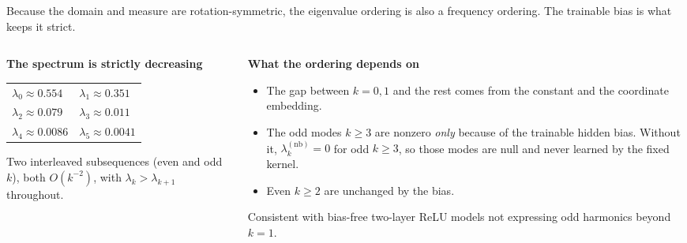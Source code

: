 \documentclass[aspectratio=169,9pt]{beamer}
\begin{document}
\begin{frame}[noframenumbering]
	{\textcolor{muted}{Because the domain and measure are rotation-symmetric, the eigenvalue ordering is also a frequency ordering. The trainable bias is what keeps it strict.}}

	\vspace{1.5mm}
	\begin{columns}[T,onlytextwidth]
		\begin{column}{0.46\textwidth}
			\begin{whitecard}[height=42mm]
				{\scriptsize\bfseries The spectrum is strictly decreasing}\par\vspace{1mm}
				{\scriptsize
					\begin{tabular}{@{}ll@{}}
						$\lambda_0\approx0.554$  & $\lambda_1\approx0.351$  \\
						$\lambda_2\approx0.079$  & $\lambda_3\approx0.011$  \\
						$\lambda_4\approx0.0086$ & $\lambda_5\approx0.0041$ \\
					\end{tabular}
				}\par\vspace{1.5mm}
				{\scriptsize Two interleaved subsequences (even and odd $k$), both $O(k^{-2})$, with $\lambda_k>\lambda_{k+1}$ throughout.}
			\end{whitecard}
		\end{column}
		\begin{column}{0.52\textwidth}
			\begin{orangecard}[height=42mm]
				{\scriptsize\bfseries What the ordering depends on}\par\vspace{1mm}
				\begin{itemize}\tightlist\scriptsize
					\item The gap between $k=0,1$ and the rest comes from the constant and the coordinate embedding.
					\item The odd modes $k\ge3$ are nonzero \emph{only} because of the trainable hidden bias. Without it, $\lambda^{(\mathrm{nb})}_k=0$ for odd $k\ge3$, so those modes are null and never learned by the fixed kernel.
					\item Even $k\ge2$ are unchanged by the bias.
				\end{itemize}
				\vspace{0.5mm}
				{\tiny\textcolor{muted}{Consistent with bias-free two-layer ReLU models not expressing odd harmonics beyond $k=1$.}}
			\end{orangecard}
		\end{column}
	\end{columns}
\end{frame}
\end{document}
